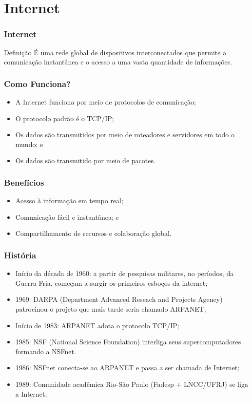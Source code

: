 \documentclass[aspectratio=169]{beamer} %
\begin{document}
\section{Internet}

\begin{frame}
	\frametitle{Internet}
	
	\begin{block}{Defini\c cão}
		É uma rede global de dispositivos interconectados que permite a comunicação instantânea e o acesso a uma vasta quantidade de informações.
	\end{block}
\end{frame}

\begin{frame}
	\frametitle{Como Funciona?}
	
	\begin{itemize}
		\item A Internet funciona por meio de protocolos de comunicação;
		\item O protocolo padrão é o TCP/IP;
		\item Os dados são transmitidos por meio de roteadores e servidores em todo o mundo; e
		\item Os dados são transmitido por meio de pacotes.
	\end{itemize}
\end{frame}

\begin{frame}
	\frametitle{Benefícios}
	
	\begin{itemize}
		\item Acesso à informação em tempo real;
		\item Comunicação fácil e instantânea; e
		\item Compartilhamento de recursos e colaboração global.
	\end{itemize}
\end{frame}

\begin{frame}
	\frametitle{História}
	
	\begin{itemize}
		\item Início da década de 1960: a partir de pesquisas militares, no períodos, da Guerra Fria, começam a surgir os primeiros esboços da internet;
		\item 1969: DARPA (Department Advanced Reseach and Projects Agency) patrocinou o projeto que mais tarde seria chamado ARPANET;
		\item Início de 1983: ARPANET adota o protocolo TCP/IP;
		\item 1985: NSF (National Science Foundation) interliga seus supercomputadores formando a NSFnet.
		\item 1986: NSFnet conecta-se ao ARPANET e passa a ser chamada de Internet;
		\item 1989: Comunidade acadêmica Rio-São Paulo (Fadesp + LNCC/UFRJ) se liga a Internet;
	\end{itemize}
\end{frame}
\end{document}
